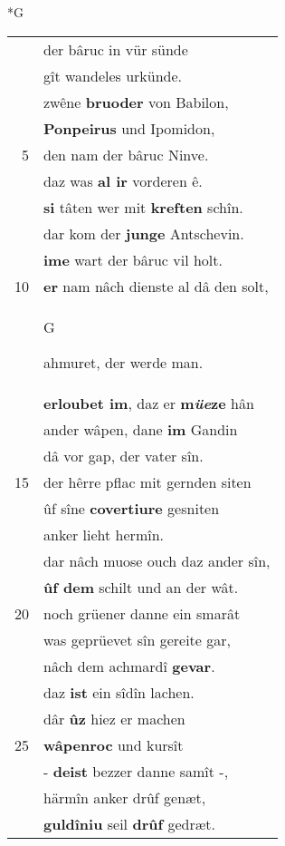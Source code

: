 \documentclass[8pt,a4paper,notitlepage]{article}
\begin{document}
\newpage
\begin{table}[ht]
\begin{minipage}[t]{0.5\linewidth}
\small
\begin{center}*G
\end{center}
\begin{tabular}{rl}
 & der bâruc in vür sünde\\ 
 & gît wandeles urkünde.\\ 
 & zwêne \textbf{bruoder} von Babilon,\\ 
 & \textbf{Ponpeirus} und Ipomidon,\\ 
5 & den nam der bâruc Ninve.\\ 
 & daz was \textbf{al ir} vorderen ê.\\ 
 & \textbf{si} tâten wer mit \textbf{kreften} schîn.\\ 
 & dar kom der \textbf{junge} Antschevin.\\ 
 & \textbf{ime} wart der bâruc vil holt.\\ 
10 & \textbf{er} nam nâch dienste al dâ den solt,\\ 
 & \begin{large}G\end{large}ahmuret, der werde man.\\ 
 & \textbf{erloubet im}, daz er \textbf{m\textit{üe}ze} hân\\ 
 & ander wâpen, dane \textbf{im} Gandin\\ 
 & dâ vor gap, der vater sîn.\\ 
15 & der hêrre pflac mit gernden siten\\ 
 & ûf sîne \textbf{covertiure} gesniten\\ 
 & anker lieht hermîn.\\ 
 & dar nâch muose ouch daz ander sîn,\\ 
 & \textbf{ûf dem} schilt und an der wât.\\ 
20 & noch grüener danne ein smarât\\ 
 & was geprüevet sîn gereite gar,\\ 
 & nâch dem achmardî \textbf{gevar}.\\ 
 & daz \textbf{ist} ein sîdîn lachen.\\ 
 & dâr \textbf{ûz} hiez er machen\\ 
25 & \textbf{wâpenroc} und kursît\\ 
 & - \textbf{deist} bezzer danne samît -,\\ 
 & härmîn anker drûf genæt,\\ 
 & \textbf{guldîniu} seil \textbf{drûf} gedræt.\\ 

\end{tabular}
\end{minipage}
\end{table}
\end{document}

